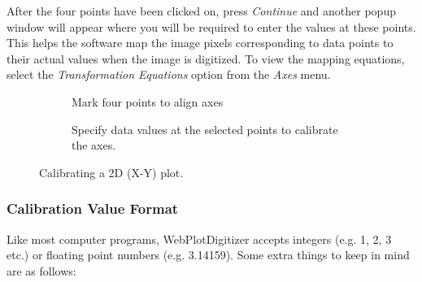 \documentclass[letterpaper, 11pt]{article}
\begin{document}
After the four points have been clicked on, press \emph{Continue} and another popup window will appear where you will be required to enter the values at these points. This helps the software map the image pixels corresponding to data points to their actual values when the image is digitized. To view the mapping equations, select the \emph{Transformation Equations} option from the \emph{Axes} menu.

\begin{figure}
\centering
{\begin{subfigure}[b]{0.4\textwidth}
\caption{Mark four points to align axes}
\end{subfigure}
\hspace{5mm}
\begin{subfigure}[b]{0.45\textwidth}
\caption{Specify data values at the selected points to calibrate the axes.}
\end{subfigure}}
\caption{Calibrating a 2D (X-Y) plot.}
\label{fig:xyAlignment}
\end{figure}

\subsubsection{Calibration Value Format}
\label{sec:formattingInput}
Like most computer programs, WebPlotDigitizer accepts integers (e.g. 1, 2, 3 etc.) or floating point numbers (e.g. 3.14159). Some extra things to keep in mind are as follows:
\end{document}

